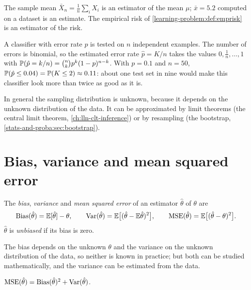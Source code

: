 \begin{notechapter}
The sample mean $\bar X_n = \frac1n\sum_iX_i$ is an estimator of the mean $\mu$;
$\bar x = 5.2$ computed on a dataset is an estimate. The empirical risk of
\cref{learning-problem:def:emprisk} is an estimator of the risk.

\begin{example}\label{stats-and-proba:ex:binomial}
A classifier with error rate $p$ is tested on $n$ independent examples. The
number of errors is binomial, so the estimated error rate $\hat p = K/n$ takes
the values $0, \frac1n, \dots, 1$ with $\mathbb{P}(\hat p = k/n) = \binom nk p^k(1-p)^{n-k}$.
With $p = 0.1$ and $n = 50$, $\mathbb{P}(\hat p\leq 0.04) = \mathbb{P}(K\leq2)\approx0.11$:
about one test set in nine would make this classifier look more than twice as
good as it is.
\end{example}

In general the sampling distribution is unknown, because it depends on the
unknown distribution of the data. It can be approximated by limit theorems
(the central limit theorem, \cref{ch:lln-clt-inference}) or by resampling (the
bootstrap, \cref{stats-and-proba:sec:bootstrap}).

\section{Bias, variance and mean squared error}\label{stats-and-proba:sec:bias-variance}

\begin{definition}
The \emph{bias}, \emph{variance} and \emph{mean squared error} of an estimator
$\hat\theta$ of $\theta$ are
\[
  \mathrm{Bias}(\hat\theta) = \mathbb{E}[\hat\theta] - \theta,\qquad
  \operatorname{Var}(\hat\theta) = \mathbb{E}\bigl[(\hat\theta - \mathbb{E}\hat\theta)^2\bigr],\qquad
  \mathrm{MSE}(\hat\theta) = \mathbb{E}\bigl[(\hat\theta - \theta)^2\bigr].
\]
$\hat\theta$ is \emph{unbiased} if its bias is zero.
\end{definition}

The bias depends on the unknown $\theta$ and the variance on the unknown
distribution of the data, so neither is known in practice; but both can be
studied mathematically, and the variance can be estimated from the data.

\begin{proposition}\label{stats-and-proba:prop:mse}
$\mathrm{MSE}(\hat\theta) = \mathrm{Bias}(\hat\theta)^2 + \operatorname{Var}(\hat\theta)$.
\end{proposition}


\end{notechapter}
